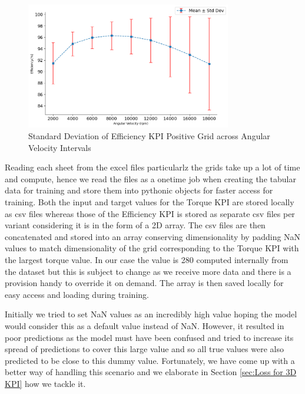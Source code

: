 \documentclass{report} %
\begin{document}
\begin{figure}[H]
    \centering
    \includegraphics[width=0.8\textwidth]{./ReportImages/stddev_y2_nn_Target.png} 
    \caption{Standard Deviation of Efficiency \ac{KPI} Positive Grid across Angular Velocity Intervals} 
    \label{fig:Standard Deviation of 3D KPI(Efficiency) Positive Grid across Angular Velocity Intervals}
\end{figure}

Reading each sheet from the excel files particularlz the grids take up a lot of time and compute, hence we read the files as a onetime job when creating the 
tabular data for training  and store them into pythonic objects for faster access for training.
Both the input and target values for the Torque \ac{KPI} are stored locally as csv files whereas those of the Efficiency \ac{KPI} is stored as separate csv files per 
variant considering it is in the form of a 2\ac{D} array.
The csv files are then concatenated and stored into an array conserving dimensionality by padding \ac{NaN} values to match dimensionality of the grid 
corresponding to the Torque \ac{KPI} with the largest torque value.
In our case the value is 280 computed internally from the dataset but this is subject to change as we receive more data and there is a provision handy to override it 
on demand. The array is then saved locally for easy access and loading during training.

Initially we tried to set \ac{NaN} values as an incredibly high value hoping the model would consider this as a default value instead of \ac{NaN}.
However, it resulted in poor predictions as the model must have been confused and tried to increase its spread of predictions to cover this large value and so all 
true values were also predicted to be close to this dummy value.
Fortunately, we have come up with a better way of handling this scenario and we elaborate in Section \ref{sec:Loss for 3D KPI} how we tackle it.
\end{document}
